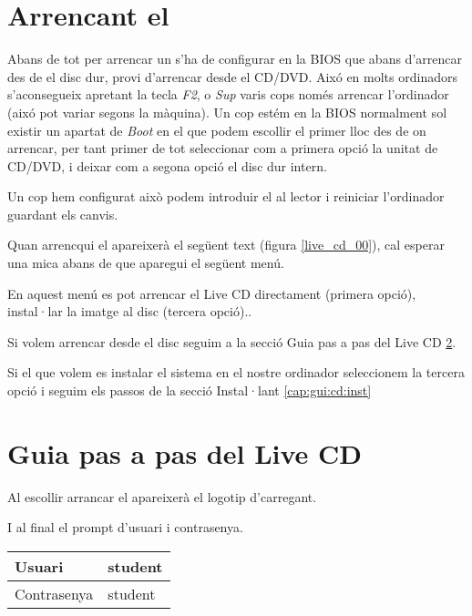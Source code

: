 \section{Arrencant el \LiveCD}\label{cap:gui:cd:boot}

Abans de tot per arrencar un \LiveCD s'ha de configurar en la BIOS que abans d'arrencar des de el disc dur, provi d'arrencar desde el CD/DVD. Aixó en molts ordinadors s'aconsegueix apretant la tecla \emph{F2}, o \emph{Sup} varis cops només arrencar l'ordinador (aixó pot variar segons la màquina). Un cop estém en la BIOS normalment sol existir un apartat de \emph{Boot} en el que podem escollir el primer lloc des de on arrencar, per tant primer de tot seleccionar com a primera opció la unitat de CD/DVD, i deixar com a segona opció el disc dur intern.

Un cop hem configurat això podem introduir el \LiveCD al lector i reiniciar l'ordinador guardant els canvis.

Quan arrencqui el \LiveCD apareixerà el següent text (figura \ref{live_cd_00}), cal esperar una mica abans de que aparegui el següent menú.

En aquest menú es pot arrencar el Live CD directament (primera opció), instal·lar la imatge al disc (tercera opció)..

Si volem arrencar desde el disc seguim a la secció Guia pas a pas del Live CD \ref{cap:gui:cd:pas}.

Si el que volem es instalar el sistema en el nostre ordinador seleccionem la tercera opció i seguim els passos de la secció Instal·lant \ref{cap:gui:cd:inst}

\section{Guia pas a pas del Live CD}\label{cap:gui:cd:pas}

Al escollir arrancar el \LiveCD apareixerà el logotip d'\Ubuntu carregant.

I al final el prompt d'usuari i contrasenya.

\begin{center}
	\begin{tabular}{l | l}
		Usuari & student \\
		\hline
		Contrasenya & student \\
		\hline
	\end{tabular}
	\label{tab:gui:cd:usr:pass}
\end{center}


